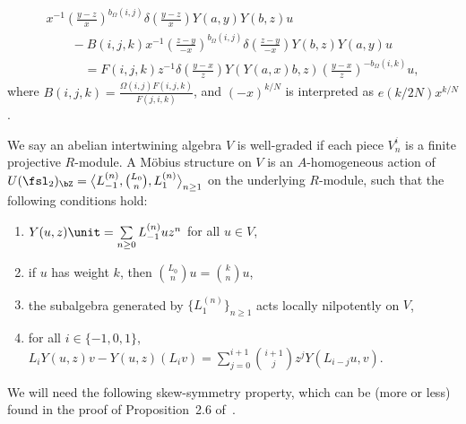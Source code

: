 \begin{defn}
\begin{enumerate}
 \begin{gather*}
 x^{-1} \left(\frac{y-z}{x} \right)^{b_\Omega(i,j)} \delta\left(\frac{y-z}{x}\right) Y(a,y) Y(b,z) u \\
\qquad{}- B(i,j,k) x^{-1} \left(\frac{z-y}{-x} \right)^{b_\Omega(i,j)} \delta\left(\frac{z-y}{-x}\right) Y(b,z) Y(a,y) u \\
 \qquad\quad{} = F(i,j,k) z^{-1} \delta\left(\frac{y-x}{z}\right) Y(Y(a,x)b,z) \left(\frac{y-x}{z} \right)^{-b_\Omega(i,k)} u,
\end{gather*}
where $B(i,j,k) = \frac{\Omega(i,j)F(i,j,k)}{F(j,i,k)}$, and $(-x)^{k/N}$ is interpreted as $e(k/2N)x^{k/N}$.
\end{enumerate}
We say an abelian intertwining algebra $V$ is well-graded if each piece $V_n^i$ is a finite projective $R$-module. A M\"obius structure on $V$ is an $A$-homogeneous action of $U(\fsl_2)_{\bZ} = \big\langle L_{-1}^{(n)}, \binom{L_0}{n}, L_1^{(n)} \big\rangle_{n \geq 1}$ on the underlying $R$-module, such that the following conditions hold:
\begin{enumerate}\itemsep=0pt
\item[1)] $Y(u,z)\unit = \sum\limits_{n \geq 0} L_{-1}^{(n)}u z^n$ for all $u \in V$,
\item[2)] if $u$ has weight $k$, then $\binom{L_0}{n}u = \binom{k}{n}u$,
\item[3)] the subalgebra generated by $\{ L_1^{(n)} \}_{n \geq 1}$ acts locally nilpotently on $V$,
\item[4)] for all $i \in \{-1,0,1\}$, $L_i Y(u,z)v - Y(u,z)(L_i v) = \sum\limits_{j =0}^{i+1} \binom{i+1}{j} z^j Y(L_{i-j} u,v)$.
\end{enumerate}
\end{defn}

We will need the following skew-symmetry property, which can be (more or less) found in the proof of Proposition~2.6 of~\cite{GL00}.

